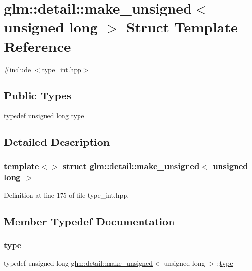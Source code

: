 \hypertarget{structglm_1_1detail_1_1make__unsigned_3_01unsigned_01long_01_4}{}\section{glm\+::detail\+::make\+\_\+unsigned$<$ unsigned long $>$ Struct Template Reference}
\label{structglm_1_1detail_1_1make__unsigned_3_01unsigned_01long_01_4}


{\ttfamily \#include $<$type\+\_\+int.\+hpp$>$}

\subsection*{Public Types}
\begin{DoxyCompactItemize}
\item 
typedef unsigned long \mbox{\hyperlink{structglm_1_1detail_1_1make__unsigned_3_01unsigned_01long_01_4_a8894ccd179135bda131b42cf10e58362}{type}}
\end{DoxyCompactItemize}


\subsection{Detailed Description}
\subsubsection*{template$<$$>$\newline
struct glm\+::detail\+::make\+\_\+unsigned$<$ unsigned long $>$}



Definition at line 175 of file type\+\_\+int.\+hpp.



\subsection{Member Typedef Documentation}
\mbox{\label{structglm_1_1detail_1_1make__unsigned_3_01unsigned_01long_01_4_a8894ccd179135bda131b42cf10e58362}} 
\subsubsection{\texorpdfstring{type}{type}}
{\footnotesize\ttfamily typedef unsigned long \mbox{\hyperlink{structglm_1_1detail_1_1make__unsigned}{glm\+::detail\+::make\+\_\+unsigned}}$<$ unsigned long $>$\+::\mbox{\hyperlink{structglm_1_1detail_1_1make__unsigned_3_01unsigned_01long_01_4_a8894ccd179135bda131b42cf10e58362}{type}}}



